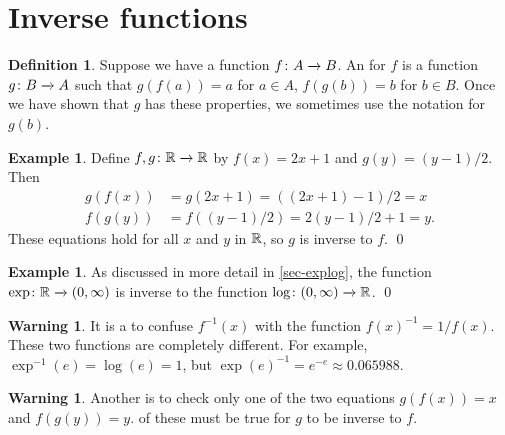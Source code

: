 \documentclass[a4paper]{book}
\theoremstyle{definition}
\newtheorem{warning}[theorem]{Warning}
\newtheorem{definition}[theorem]{Definition}
\newtheorem{example}[theorem]{Example}
\begin{document}
\section{Inverse functions}
\label{sec-func-inv}

\begin{definition}
 Suppose we have a function $f\colon A\xrightarrow{}B$.  An  for $f$
 is a function $g\colon B\xrightarrow{}A$ such that $g(f(a))=a$ for 
 $a\in A$,  $f(g(b))=b$ for  $b\in B$.  Once we
 have shown that $g$ has these properties, we sometimes use the
 notation  for $g(b)$.
\end{definition}
\begin{example}
 Define $f,g\colon{\mathbb{R}}\xrightarrow{}{\mathbb{R}}$ by $f(x)=2x+1$ and $g(y)=(y-1)/2$.  Then
 \begin{align*}
  g(f(x)) &= g(2x+1) = ((2x+1)-1)/2 = x \\
  f(g(y)) &= f((y-1)/2) = 2(y-1)/2 + 1 = y.
 \end{align*}
 These equations hold for all $x$ and $y$ in ${\mathbb{R}}$, so $g$ is inverse
 to $f$. \qed
\end{example}
\begin{example}
 As discussed in more detail in \autoref{sec-explog}, the function
 $\exp\colon{\mathbb{R}}\xrightarrow{}(0,\infty)$ is inverse to the function
 $\log\colon(0,\infty)\xrightarrow{}{\mathbb{R}}$.  \qed
\end{example}
\begin{warning}
 It is a  to confuse $f^{-1}(x)$ with
 the function $f(x)^{-1}=1/f(x)$.  These two functions are completely
 different.  For example, $\exp^{-1}(e)=\log(e)=1$, but
 $\exp(e)^{-1}=e^{-e}\approx 0.065988$.
\end{warning}
\begin{warning}
 Another  is to check only one of the
 two equations $g(f(x))=x$ and $f(g(y))=y$.   of these must
 be true for $g$ to be inverse to $f$.
\end{warning}
\end{document}
